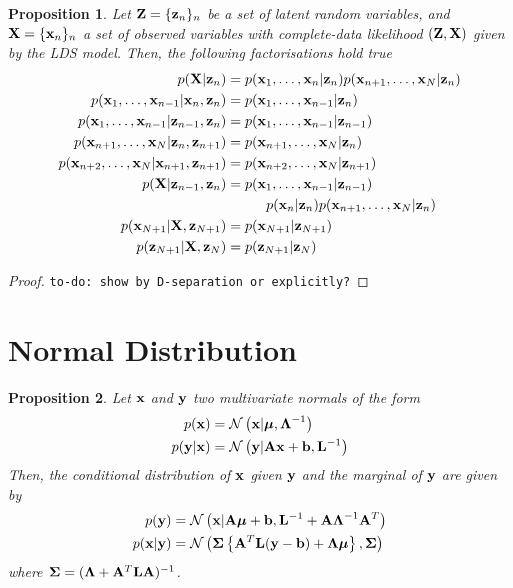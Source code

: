 \documentclass[11pt]{article}
\numberwithin{equation}{section}
\newcommand{\x}{{\bf x}}
\newcommand{\z}{{\bf z}}
\newcommand{\N}{\mathcal{N}}
\newtheorem{proposition}{Proposition}[section]
\begin{document}
\begin{proposition} \label{prop:graphical-models-separation}
	Let ${\bf Z} = \{\z_n\}_n$ be a set of latent random variables, and ${\bf X} = \{\x_n\}_n$ a set of observed variables with complete-data likelihood $({\bf Z}, {\bf X})$ given by the LDS model. Then, the following factorisations hold true
	\begin{align}
		p({\bf X}\vert\z_n) &= p({\x_1, \ldots, \x_n \vert \z_n})p({\x_{n+1}, \ldots, \x_N \vert \z_n}) \label{eq:gm-1}\\
		p(\x_1, \ldots, \x_{n-1}\vert \x_n, \z_n) &= p(\x_1, \ldots, \x_{n-1}\vert \z_n)\\
		p(\x_1, \ldots, \x_{n-1}\vert \z_{n-1}, \z_{n}) &= p(\x_1, \ldots, \x_{n-1}\vert \z_{n-1})\\
		p(\x_{n+1}, \ldots, \x_N \vert \z_n, \z_{n+1}) &= p(\x_{n+1}, \ldots, \x_N \vert \z_n)\\
		p(\x_{n+2}, \ldots, \x_N\vert \x_{n+1}, \z_{n+1}) &= p(\x_{n+2}, \ldots, \x_N \vert \z_{n+1})\\
		p({\bf X}\vert \z_{n-1}, \z_{n}) &= p(\x_1, \ldots, \x_{n-1}\vert \z_{n-1}) \nonumber\\
			&\hspace{1cm}p(\x_n\vert \z_n) p(\x_{n+1}, \ldots, \x_N \vert \z_n)\\
		p(\x_{N+1} \vert {\bf X}, \z_{N+1}) &= p(\x_{N+1} \vert \z_{N+1})\\
		p(\z_{N+1} \vert {\bf X}, \z_{N}) &= p(\z_{N+1} \vert \z_{N})\\
	\end{align}
\end{proposition}

\begin{proof}
	\texttt{to-do: show by D-separation or explicitly?}
\end{proof}

\section{Normal Distribution}
\begin{proposition} \label{prop:multivariate-normal-combination}
	Let $\x$ and ${\bf y}$ two multivariate normals of the form
	\begin{align}
		p(\x) &= \N\left(\x \vert \boldsymbol\mu, \boldsymbol\Lambda^{-1}\right)\\
		p({\bf y} \vert \x ) &= \N\left({\bf y} \vert {\bf A}\x + {\bf b}, {\bf L}^{-1}\right)
	\end{align}
	Then, the conditional distribution of $\x$ given ${\bf y}$ and the marginal of ${\bf y}$ are given by
	\begin{align}
		p({\bf y}) &= \N\left(\x\vert {\bf A}\boldsymbol\mu + {\bf b}, {\bf L}^{-1} + {\bf A}\boldsymbol\Lambda^{-1}{\bf A}^T\right) \label{eq:normal-marginal}\\
		p(\x \vert {\bf y}) &= \N\left(\boldsymbol\Sigma\left\{{\bf A}^T {\bf L}({\bf y} - {\bf b})  + \boldsymbol\Lambda\boldsymbol\mu \right\}, \boldsymbol\Sigma\right) \label{eq:normal-conditional}
	\end{align}
	where $\boldsymbol{\Sigma} = (\boldsymbol\Lambda + {\bf A}^T {\bf L} {\bf A})^{-1}$.
\end{proposition}
\end{document}
